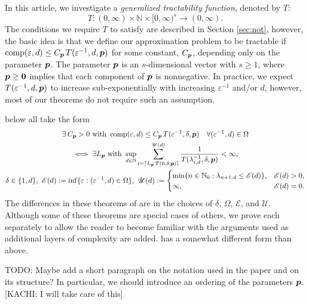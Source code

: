 \documentclass[sort&compress]{elsarticle}
\newcommand{\thed}{\delta}
\newcommand{\theM}{\mathscr{E}}
\newcommand{\theUB}{\mathscr{U}}
\newcommand{\peter}[1]{\begingroup\color{violet}#1\endgroup}
\newcommand{\kachi}[1]{\begingroup\color{ForestGreen}#1\endgroup}
\begin{document}
In this article, we investigate a \emph{generalized tractability function}, denoted by $T$:
\begin{equation} \label{eq:Tspec}
    T :(0,\infty) \times \mathbb{N} \times [0,\infty)^s \rightarrow (0,\infty).
\end{equation}
The conditions we require $T$ to satisfy are described in  Section \ref{sec:not}, however, the basic idea is that we define our approximation problem to be tractable if $\operatorname{comp}(\varepsilon, d) \le  C_{\boldsymbol{p}}\, T(\varepsilon^{-1},d,\boldsymbol{p})$ for some constant, $C_{\boldsymbol{p}}$, depending only on the parameter $\boldsymbol{p}$. The parameter $\boldsymbol{p}$ is an $s$-dimensional vector with $s \geq 1$, where $\boldsymbol{p} \geq \boldsymbol{0}$ implies that each component of $\boldsymbol{p}$ is nonnegative. In practice, we expect $T(\varepsilon^{-1},d,\boldsymbol{p})$ to increase sub-exponentially  with increasing $\varepsilon^{-1}$ and/or $d$, however, most of our theorems do not require such an assumption.

 below all take the form
\begin{multline}
  \exists \,C_{\vp} > 0 \text{ with }
    \comp(\varepsilon, d) \le  C_{\vp}\, T(\varepsilon^{-1},\thed,\vp) \quad \forall (\varepsilon^{-1},d) \in \Omega \\
    \iff   \exists L_{\vp} \text{ with }
    \sup_{d \in \naturals}
     \sum_{i = \lceil L_{\vp}\, T(0,\thed,\vp) \rceil}^{\theUB(d)} \frac{1}{T(\lambda^{-1}_{i,d},\thed,\vp)}< \infty, \\
     \thed \in \{1,d\}, \ \theM(d) := \inf \{\varepsilon : (\varepsilon^{-1},d) \in \Omega \}, \
     \theUB(d) := \begin{cases}
        \min\{n \in \natzero : \lambda_{n+1,d} \le \theM(d) \}, &   \theM(d) > 0, \\
        \infty, & \theM(d) = 0.
        \end{cases}
\end{multline}
The differences in these theorems of are in the choices of $\thed$, $\Omega$, $\theM$, and $\theUB$.  Although some of these theorems are special cases of others, we prove each separately to allow the reader to become familiar with the arguments used as additional layers of complexity are added.
\Cref{thm:subhT} has a somewhat different form than above.  


\peter{TODO: Maybe add a short paragraph on the notation used in the paper and on its structure? In particular, we should introduce
an ordering of the parameters $\boldsymbol{p}$.}[\kachi{KACHI: I will take care of this}]
\end{document}
